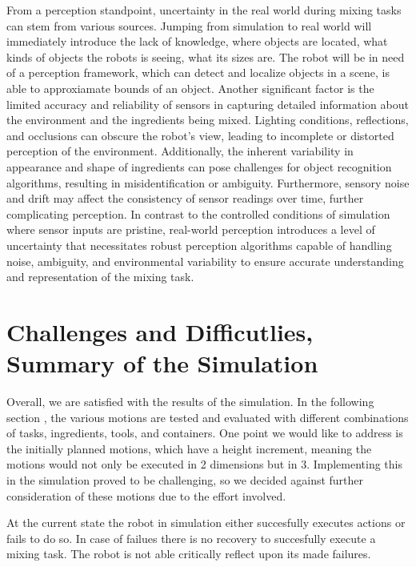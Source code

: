 From a perception standpoint, uncertainty in the real world during mixing tasks can stem from various sources.
Jumping from simulation to real world will immediately introduce the lack of knowledge, where objects are located, what kinds of objects
the robots is seeing, what its sizes are. The robot will be in need of a perception framework, which can detect and localize objects in a scene,
is able to approxiamate bounds of an object.
Another significant factor is the limited accuracy and reliability of sensors in capturing detailed information about the environment and the ingredients being mixed.
Lighting conditions, reflections, and occlusions can obscure the robot's view, leading to incomplete or distorted perception of the environment.
Additionally, the inherent variability in appearance and shape of ingredients can pose challenges for object recognition algorithms, resulting in misidentification or ambiguity.
Furthermore, sensory noise and drift may affect the consistency of sensor readings over time, further complicating perception.
In contrast to the controlled conditions of simulation where sensor inputs are pristine, real-world perception introduces a level of uncertainty that necessitates robust perception algorithms capable of handling noise, ambiguity, and environmental variability to ensure accurate understanding and representation of the mixing task.


\section{Challenges and Difficutlies, Summary of the Simulation}
Overall, we are satisfied with the results of the simulation. In the following section , the various motions are tested and evaluated with different combinations of tasks, ingredients, tools, and containers. One point we would like to address is the initially planned motions, which have a height increment, meaning the motions would not only be executed in 2 dimensions but in 3. Implementing this in the simulation proved to be challenging, so we decided against further consideration of these motions due to the effort involved.

At the current state the robot in simulation either succesfully executes actions or fails to do so.
In case of failues there is no recovery to succesfully execute a mixing task. The robot is not able critically
reflect upon its made failures.
